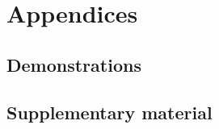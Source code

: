 \documentclass[12pt, titlepage]{report}
\begin{document}

%  
  \chapter{Appendices}
  \section{Demonstrations}
  
  \section{Supplementary material}
  
  \printbibliography
\end{document}
